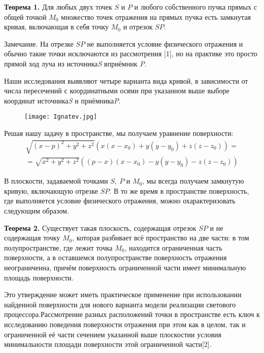 \textbf{Теорема 1.}
Для любых двух точек $S$ и $P$ и любого собственного пучка прямых с общей точкой $M_0$ множество точек отражения на прямых пучка есть замкнутая кривая, включающая в себя точку $M_0$ и отрезок $SP$.

Замечание. На отрезке $SP$ не выполняется условие физического отражения и обычно такие точки исключаются из рассмотрения [1], но на практике это просто прямой ход луча из источника\textit{S} вприёмник \textit{P}.

Наши исследования выявляют четыре варианта вида кривой, в зависимости от числа пересечений с координатными осями при указанном выше выборе координат источника\textit{S} и приёмника\textit{P}.

\begin{figure}
	\centering
	\texttt{[image: Ignatev.jpg]}
\end{figure}

Решая нашу задачу в пространстве, мы получаем уравнение поверхности:
%
\begin{multline*}
	\sqrt{{\left(x-p\right)}^2+y^2+z^2}\left(x\left(x-x_0\right)+y\left(y-y_0\right)+z\left(z-z_0\right)\right)=
	\\=
	\sqrt{x^2+y^2+z^2}\left(\left(p-x\right)\left(x-x_0\right)-y\left(y-y_0\right)-z\left(z-z_0\right)\right)
\end{multline*}

В плоскости, задаваемой точками $S,\ P$ и $M_0$, мы всегда получаем замкнутую кривую, включающую отрезке $SP$. В то же время в пространстве поверхность, где выполняется условие физического отражения, можно охарактеризовать следующим образом.

\textbf{Теорема 2.}  Существует такая плоскость, содержащая отрезок $SP$ и не содержащая точку $M_0$, которая разбивает всё пространство на две части: в том полупространстве, где лежит точка $M_0$, находится ограниченная часть поверхности, а в оставшемся полупространстве поверхность отражения неограниченна, причём поверхность ограниченной части имеет минимальную площадь поверхности.

Это утверждение может иметь практическое применение при использовании найденной поверхности для нового варианта модели реализации светового процессора.Рассмотрение разных расположений точки в пространстве есть ключ к исследованию поведения поверхности отражения при этом как в целом, так и ограниченной её части сечением указанной выше плоскостии условия минимальности площади поверхности этой ограниченной части[2].

